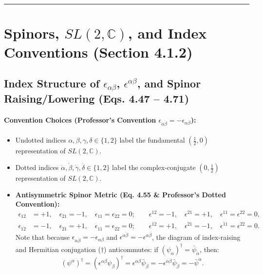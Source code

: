 \documentclass[11pt,a4paper]{article}
\begin{document}
\vspace{0.5em}\hrule\vspace{1em}

\section{Spinors, $SL(2,\mathbb{C})$, and Index Conventions (Section 4.1.2)}

\subsection{Index Structure of $\epsilon_{\alpha\beta}$, $\epsilon^{\alpha\beta}$, and Spinor Raising/Lowering (Eqs. 4.47 -- 4.71)}
\paragraph{Convention Choices (Professor's Convention $\epsilon_{\dot{\alpha}\dot{\beta}} = -\epsilon_{\alpha\beta}$):}
\begin{itemize}
    \item Undotted indices $\alpha,\beta,\gamma,\delta \in \{1,2\}$ label the fundamental $(\frac{1}{2},0)$ representation of $SL(2,\mathbb{C})$.
    \item Dotted indices $\dot{\alpha},\dot{\beta},\dot{\gamma},\dot{\delta} \in \{1,2\}$ label the complex-conjugate $(0,\frac{1}{2})$ representation of $SL(2,\mathbb{C})$.
    \item \textbf{Antisymmetric Spinor Metric (Eq. 4.55 \& Professor's Dotted Convention):}
    \begin{align}
        \epsilon_{12} &= +1, \quad \epsilon_{21} = -1, \quad \epsilon_{11}=\epsilon_{22}=0; \qquad \epsilon^{12} = -1, \quad \epsilon^{21} = +1, \quad \epsilon^{11}=\epsilon^{22}=0, \\
        \epsilon_{\dot{1}\dot{2}} &= -1, \quad \epsilon_{\dot{2}\dot{1}} = +1, \quad \epsilon_{\dot{1}\dot{1}}=\epsilon_{\dot{2}\dot{2}}=0; \qquad \epsilon^{\dot{1}\dot{2}} = +1, \quad \epsilon^{\dot{2}\dot{1}} = -1, \quad \epsilon^{\dot{1}\dot{1}}=\epsilon^{\dot{2}\dot{2}}=0.
    \end{align}
    Note that because $\epsilon_{\dot{\alpha}\dot{\beta}} = -\epsilon_{\alpha\beta}$ and $\epsilon^{\dot{\alpha}\dot{\beta}} = -\epsilon^{\alpha\beta}$, the diagram of index-raising and Hermitian conjugation ($\dagger$) anticommutes: if $(\psi_\alpha)^\dagger = \bar{\psi}_{\dot{\alpha}}$, then:
    \begin{equation}
        (\psi^\alpha)^\dagger = (\epsilon^{\alpha\beta}\psi_\beta)^\dagger = \epsilon^{\alpha\beta}\bar{\psi}_{\dot{\beta}} = -\epsilon^{\dot{\alpha}\dot{\beta}}\bar{\psi}_{\dot{\beta}} = -\bar{\psi}^{\dot{\alpha}}.
    \end{equation}
\end{itemize}
\end{document}
